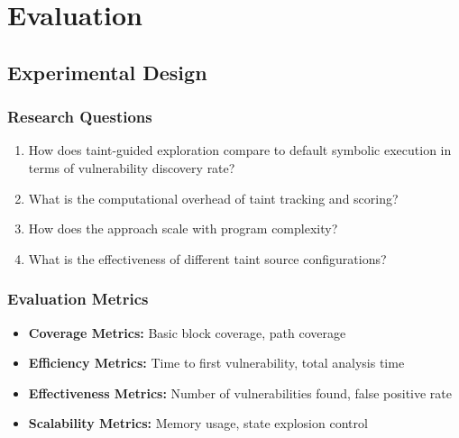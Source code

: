 \chapter{Evaluation}


\section{Experimental Design}
\subsection{Research Questions}
\begin{enumerate}
    \item How does taint-guided exploration compare to default symbolic execution in terms of vulnerability discovery rate?
    \item What is the computational overhead of taint tracking and scoring?
    \item How does the approach scale with program complexity?
    \item What is the effectiveness of different taint source configurations?
\end{enumerate}

\subsection{Evaluation Metrics}
\begin{itemize}
    \item \textbf{Coverage Metrics:} Basic block coverage, path coverage
    \item \textbf{Efficiency Metrics:} Time to first vulnerability, total analysis time
    \item \textbf{Effectiveness Metrics:} Number of vulnerabilities found, false positive rate
    \item \textbf{Scalability Metrics:} Memory usage, state explosion control
\end{itemize}

